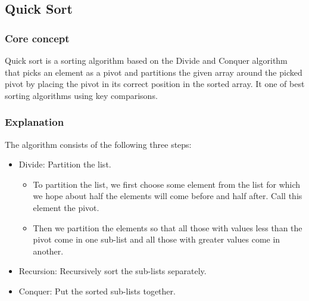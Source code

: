 \subsection{Quick Sort}

\subsubsection{Core concept}
Quick sort is a sorting algorithm based on the Divide and Conquer algorithm that picks an element as a pivot and partitions the given array around the picked pivot by placing the pivot in its correct position in the sorted array. It one of best sorting algorithms using key comparisons. 

\subsubsection{Explanation}

The algorithm consists of the following three steps: ~\cite{ref1}
\begin{itemize}[label=-]
    \item Divide: Partition the list.
    \begin{itemize}[label=$\bullet$]
        \item To partition the list, we first choose some element from the list for which we hope about half the elements will come before and half after. Call this element the pivot.
        \item Then we partition the elements so that all those with values less than the pivot come in one sub-list and all those with greater values come in another.
    \end{itemize}
    \item Recursion: Recursively sort the sub-lists separately.
    \item Conquer: Put the sorted sub-lists together.
\end{itemize}


